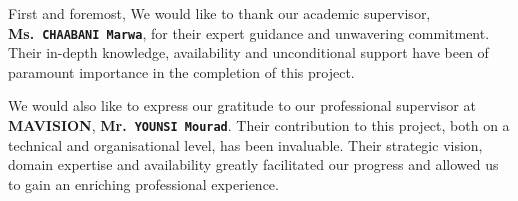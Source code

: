 \documentclass[12pt,a4paper]{report}
\begin{document}
First and foremost, We would like to thank our academic supervisor,
\textbf{Ms.~\texttt{CHAABANI Marwa}}, for their expert guidance and
unwavering commitment. Their in-depth knowledge, availability and unconditional support
have been of paramount importance in the completion of this project.

We would also like to express our gratitude to our professional supervisor at
\textbf{MAVISION}, \textbf{Mr.~\texttt{YOUNSI Mourad}}. Their
contribution to this project, both on a technical and organisational level, has been
invaluable. Their strategic vision, domain expertise and availability greatly facilitated
our progress and allowed us to gain an enriching professional experience.

\newpage

\setcounter{page}{1}

\setcounter{tocdepth}{3}
\tableofcontents
\newpage

{
  \setlength{\cftbeforelottitleskip}{0pt}
  \setlength{\cftafterlottitleskip}{10pt}
  \listoftables
}
\newpage
{
  \setlength{\cftbeforeloftitleskip}{0pt}
  \setlength{\cftafterloftitleskip}{10pt}
  \listoffigures
}
\newpage
\end{document}
